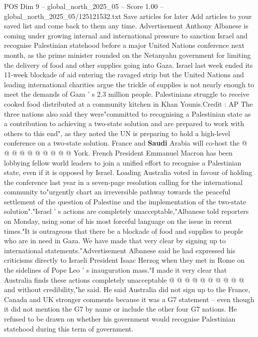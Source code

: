 \begin{textsample}{POS Dim 9 – global\_north\_2025\_05 – Score 1.00 – global\_north\_2025\_05/125121532.txt}  \label{ex:f9_pos_270}
Save articles for later Add articles to your saved list and come back to them any time.
Advertisement Anthony Albanese is coming under growing internal and international pressure to sanction Israel and recognise Palestinian statehood before a major United Nations conference next month, as the prime minister rounded on the Netanyahu government for limiting the delivery of food and other supplies going into Gaza.
Israel last week ended its 11-week blockade of aid entering the ravaged strip but the United Nations and leading international charities argue the trickle of supplies is not nearly enough to meet the demands of Gaza ' s 2.3 million people.
Palestinians struggle to receive cooked food distributed at a community kitchen in Khan Younis.Credit : AP The three nations also said they were"committed to recognising a Palestinian state as a contribution to achieving a two-state solution and are prepared to work with others to this end", as they noted the UN is preparing to hold a high-level conference on a two-state solution.
France and \textbf{Saudi} Arabia will co-host the @ @ @ @ @ @ @ @ @ @ York.
French President Emmanuel Macron has been lobbying fellow world leaders to join a unified effort to recognise a Palestinian state, even if it is opposed by Israel.
Loading Australia voted in favour of holding the conference last year in a seven-page resolution calling for the international community to"urgently chart an irreversible pathway towards the peaceful settlement of the question of Palestine and the implementation of the two-state solution"."Israel ' s actions are completely unacceptable,"Albanese told reporters on Monday, using some of his most forceful language on the issue in recent times."It is outrageous that there be a blockade of food and supplies to people who are in need in Gaza.
We have made that very clear by signing up to international statements."Advertisement Albanese said he had expressed his criticisms directly to Israeli President Isaac Herzog when they met in Rome on the sidelines of Pope Leo ' s inauguration mass."I made it very clear that Australia finds these actions completely unacceptable @ @ @ @ @ @ @ @ @ @ and without credibility,"he said.
He said Australia did not sign up to the France, Canada and UK stronger comments because it was a G7 statement -- even though it did not mention the G7 by name or include the other four G7 nations.
He refused to be drawn on whether his government would recognise Palestinian statehood during this term of government.

\end{textsample}
